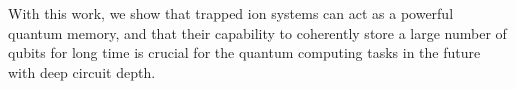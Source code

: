 \begin{abstract*}
  With this work, we show that trapped ion systems can act as a powerful quantum memory, and that their capability to coherently store a large number of qubits for long time is crucial for the quantum computing tasks in the future with deep circuit depth.

\end{abstract*}
